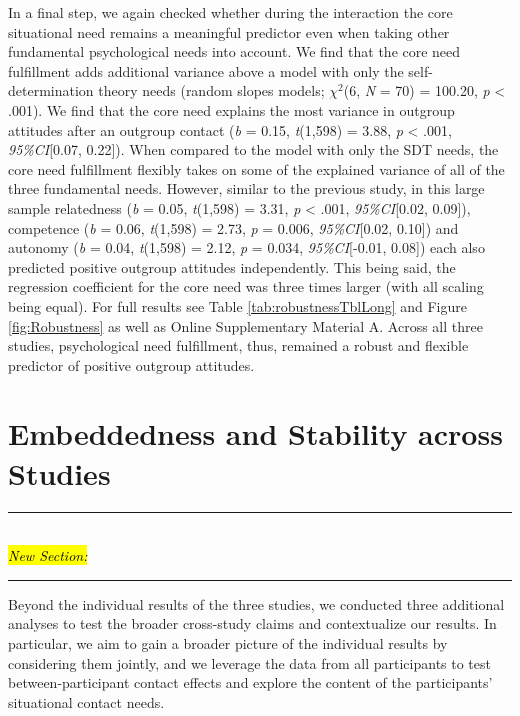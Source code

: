 In a final step, we again checked whether during the interaction the
core situational need remains a meaningful predictor even when taking
other fundamental psychological needs into account. We find that the
core need fulfillment adds additional variance above a model with only
the self-determination theory needs (random slopes models; \(\chi^2\)(6,
\textit{N} = 70) = 100.20, \textit{p} \textless{} .001). We find that
the core need explains the most variance in outgroup attitudes after an
outgroup contact (\textit{b} = 0.15, \textit{t}(1,598) = 3.88,
\textit{p} \textless{} .001, \textit{95\%CI}{[}0.07, 0.22{]}). When
compared to the model with only the SDT needs, the core need fulfillment
flexibly takes on some of the explained variance of all of the three
fundamental needs. However, similar to the previous study, in this large
sample relatedness (\textit{b} = 0.05, \textit{t}(1,598) = 3.31,
\textit{p} \textless{} .001, \textit{95\%CI}{[}0.02, 0.09{]}),
competence (\textit{b} = 0.06, \textit{t}(1,598) = 2.73, \textit{p} =
0.006, \textit{95\%CI}{[}0.02, 0.10{]}) and autonomy (\textit{b} = 0.04,
\textit{t}(1,598) = 2.12, \textit{p} = 0.034, \textit{95\%CI}{[}-0.01,
0.08{]}) each also predicted positive outgroup attitudes independently.
This being said, the regression coefficient for the core need was three
times larger (with all scaling being equal). For full results see Table
\ref{tab:robustnessTblLong} and Figure \ref{fig:Robustness} as well as
Online Supplementary Material A. Across all three studies, psychological
need fulfillment, thus, remained a robust and flexible predictor of
positive outgroup attitudes.

\section{Embeddedness and Stability across Studies}

\begin{center}
    \noindent\rule{8cm}{0.4pt}\\
    \hl{\textit{New Section:}}\\
    \vspace{-0.25cm}
    \noindent\rule{8cm}{0.4pt}
\end{center}

Beyond the individual results of the three studies, we conducted three
additional analyses to test the broader cross-study claims and
contextualize our results. In particular, we aim to gain a broader
picture of the individual results by considering them jointly, and we
leverage the data from all participants to test between-participant
contact effects and explore the content of the participants' situational
contact needs.

